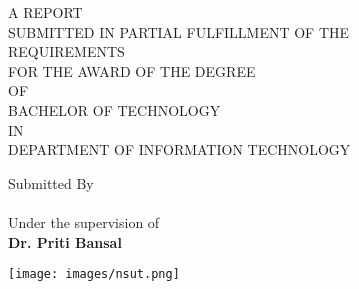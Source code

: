\begin{titlepage}
\begin{center}
\fontsize{15pt}{1cm}\selectfont {\btptitle}

\vspace*{1.4cm}
\fontsize{15pt}{21pt}\selectfont A REPORT 
\\ SUBMITTED IN PARTIAL FULFILLMENT OF THE \\ REQUIREMENTS \\ FOR THE AWARD OF THE DEGREE \\ OF \\ BACHELOR OF TECHNOLOGY \\
IN \\ DEPARTMENT OF INFORMATION TECHNOLOGY 


\vspace*{0.6cm}
Submitted By\\
\fontsize{15pt}{21pt}\selectfont {STUBH LAL (Roll No.: 2020UIT3116)\\MANIK (Roll No.: 2020UIT3124)\\ SIPPU UTKARSH (Roll No.: 2020UIT3137)} \linebreak
\\Under the supervision of\\
\textbf{Dr. Priti Bansal}

\vspace*{0.2cm}
\texttt{[image: images/nsut.png]}

\vspace*{0.3cm}
\fontsize{15pt}{16pt}\selectfont {DIVISION OF INFORMATION TECHNOLOGY\\NETAJI SUBHAS UNIVERSITY OF TECHNOLOGY\\MAY 2024}

\end{center}
\end{titlepage}